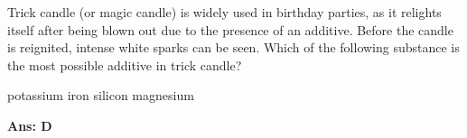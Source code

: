 \documentclass[border=3pt,varwidth=70mm]{standalone}
\begin{document}
Trick candle (or magic candle) is widely used in birthday parties, as it relights itself after being blown out due to the presence of an additive. Before the candle is reignited, intense white sparks can be seen. Which of the following substance is the most possible additive in trick candle?

\begin{choices}
\choice potassium
\choice iron
\choice silicon
\choice magnesium
\end{choices}

\begin{answer}
\hrulefill\par
\textbf{Ans: D}


\end{answer}
\end{document}
